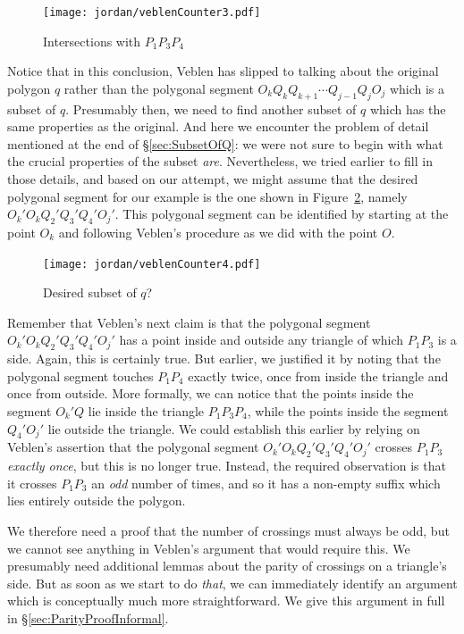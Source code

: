 \begin{figure}
\centering
\texttt{[image: jordan/veblenCounter3.pdf]}
\caption{Intersections with $P_1P_3P_4$}
\label{fig:VeblenCounter3}
\end{figure}

Notice that in this conclusion, Veblen has slipped to talking about the original polygon $q$ rather than the polygonal segment $O_kQ_kQ_{k+1}\cdots Q_{j-1}Q_jO_j$ which is a subset of $q$. Presumably then, we need to find another subset of $q$ which has the same properties as the original. And here we encounter the problem of detail mentioned at the end of \S\ref{sec:SubsetOfQ}: we were not sure to begin with what the crucial properties of the subset \emph{are}. Nevertheless, we tried earlier to fill in those details, and based on our attempt, we might assume that the desired polygonal segment for our example is the one shown in Figure~\ref{fig:VeblenCounter4}, namely $O_k'O_kQ_2'Q_3'Q_4'O_j'$. This polygonal segment can be identified by starting at the point $O_k$ and following Veblen's procedure as we did with the point $O$. 

\begin{figure}
\centering
\texttt{[image: jordan/veblenCounter4.pdf]}
\caption{Desired subset of $q$?}
\label{fig:VeblenCounter4}
\end{figure}

Remember that Veblen's next claim is that the polygonal segment $O_k'O_kQ_2'Q_3'Q_4'O_j'$ has a point inside and outside any triangle of which $P_1P_3$ is a side. Again, this is certainly true. But earlier, we justified it by noting that the polygonal segment touches $P_1P_4$ exactly twice, once from inside the triangle and once from outside. More formally, we can notice that the points inside the segment $O_k'Q$ lie inside the triangle $P_1P_3P_4$, while the points inside the segment $Q_4'O_j'$ lie outside the triangle. We could establish this earlier by relying on Veblen's assertion that the polygonal segment $O_k'O_kQ_2'Q_3'Q_4'O_j'$ crosses $P_1P_3$ \emph{exactly once}, but this is no longer true. Instead, the required observation is that it crosses $P_1P_3$ an \emph{odd} number of times, and so it has a non-empty suffix which lies entirely outside the polygon. 

We therefore need a proof that the number of crossings must always be odd, but we cannot see anything in Veblen's argument that would require this. We presumably need additional lemmas about the parity of crossings on a triangle's side. But as soon as we start to do \emph{that}, we can immediately identify an argument which is conceptually much more straightforward. We give this argument in full in \S\ref{sec:ParityProofInformal}.

